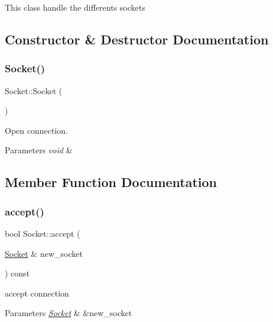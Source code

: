 This class handle the differents sockets 

\subsection{Constructor \& Destructor Documentation}
\mbox{\label{class_socket_a7c3256c4fc6e2c603df73201049fae5a}} 
\subsubsection{\texorpdfstring{Socket()}{Socket()}}
{\footnotesize\ttfamily Socket\+::\+Socket (\begin{DoxyParamCaption}{ }\end{DoxyParamCaption})}



Open connection. 


\begin{DoxyParams}{Parameters}
{\em void} & \\
\hline
\end{DoxyParams}


\subsection{Member Function Documentation}
\mbox{\label{class_socket_a97890001096a3d61683992015eaffdfa}} 
\subsubsection{\texorpdfstring{accept()}{accept()}}
{\footnotesize\ttfamily bool Socket\+::accept (\begin{DoxyParamCaption}\item[{\hyperlink{class_socket}{Socket} \&}]{new\+\_\+socket }\end{DoxyParamCaption}) const}



accept connection 


\begin{DoxyParams}{Parameters}
{\em \hyperlink{class_socket}{Socket}} & \&new\+\_\+socket \\
\hline
\end{DoxyParams}
\mbox{\label{class_socket_ad345c15e8e9f12c8fda4117e9dcc5835}} 
